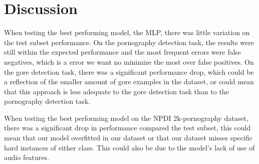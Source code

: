 \section{Discussion}\label{sec:discussion}
When testing the best performing model, the MLP, there was little variation on the test subset performance. 
On the pornography detection task, the results were still within the expected performance and the most frequent errors were false negatives, which is a error we want no minimize the most over false positives.
On the gore detection task, there was a significant performance drop, which could be a reflection of the smaller amount of gore examples in the dataset, or could mean that this approach is less adequate to the gore detection task than to the pornography detection task.

When testing the best performing model on the NPDI 2k-pornography dataset, there was a significant drop in performance compared the test subset, this could mean that our model overfitted in our dataset or that our dataset misses specific hard instances of either class. This could also be due to the model's lack of use of audio features.

